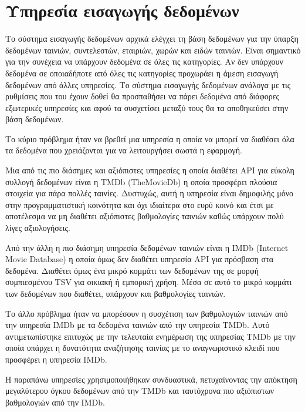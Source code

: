 \section{Υπηρεσία εισαγωγής δεδομένων}

Το σύστημα εισαγωγής δεδομένων αρχικά ελέγχει τη βάση δεδομένων για την ύπαρξη δεδομένων
ταινιών, συντελεστών, εταιριών, χωρών
και ειδών ταινιών. Είναι σημαντικό για την συνέχεια να υπάρχουν δεδομένα σε όλες τις κατηγορίες. Αν δεν υπάρχουν δεδομένα σε οποιαδήποτε από όλες τις κατηγορίες προχωράει η άμεση εισαγωγή δεδομένων από άλλες υπηρεσίες. 
Το σύστημα εισαγωγής δεδομένων ανάλογα με τις ρυθμίσεις που του έχουν δοθεί θα προσπαθήσει να πάρει δεδομένα από διάφορες εξωτερικές υπηρεσίες και αφού τα συσχετίσει μεταξύ τους θα τα αποθηκεύσει στην βάση δεδομένων. 

Το κύριο πρόβλημα ήταν να βρεθεί μια υπηρεσία
η οποία να μπορεί να διαθέσει όλα τα δεδομένα που χρειάζονται για να λειτουργήσει σωστά η εφαρμογή. 

Μια από τις πιο διάσημες και αξιόπιστες υπηρεσίες η οποία διαθέτει API για εύκολη συλλογή δεδομένων είναι η TMDb (TheMovieDb) η οποία προσφέρει πλούσια στοιχεία για πάρα πολλές ταινίες. Δυστυχώς, αυτή η υπηρεσία είναι δημοφιλής
μόνο στην προγραμματιστική κοινότητα και όχι ιδιαίτερα στο ευρύ κοινό και έτσι με αποτέλεσμα να μη διαθέτει αξιόπιστες βαθμολογίες ταινιών καθώς υπάρχουν πολύ λίγες αξιολογήσεις. 

Από την άλλη η πιο διάσημη υπηρεσία δεδομένων ταινιών είναι η IMDb (Internet Movie Database) η οποία όμως δεν διαθέτει υπηρεσία API για πρόσβαση στα δεδομένα. Διαθέτει όμως ένα μικρό κομμάτι των δεδομένων της σε μορφή συμπιεσμένου TSV για οικιακή ή εμπορική χρήση. Μέσα σε αυτό το μικρό κομμάτι των δεδομένων που διαθέτει, υπάρχουν και βαθμολογίες ταινιών. 

Το άλλο πρόβλημα ήταν να μπορέσουν η συσχέτιση των βαθμολογιών
ταινιών από την υπηρεσία IMDb με τα δεδομένα ταινιών από την υπηρεσία TMDb. Αυτό αντιμετωπίστηκε επιτυχώς
με την τελευταία ενημέρωση της υπηρεσίας TMDb με την οποία υπάρχει η δυνατότητα αναζήτησης ταινίας με το αναγνωριστικό κλειδί που προσφέρει η υπηρεσία IMDb.

Η παραπάνω υπηρεσίες χρησιμοποιήθηκαν συνδυαστικά, πετυχαίνοντας την απόκτηση μεγαλύτερου όγκου δεδομένων από την TMDb και ταυτόχρονα πιο αξιόπιστων βαθμολογιών από την IMDb.


